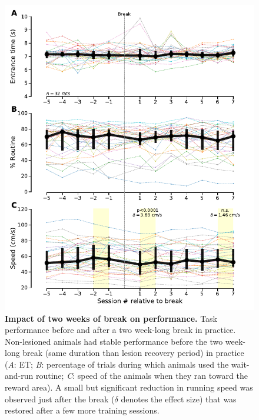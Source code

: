 \begin{figure}[h!]
	\begin{center}
		\includegraphics[scale=1]{ch-appendicies/figures/BreakEffect.pdf}
		\caption[Impact of a Two-week Break]
		{\textbf{Impact of two weeks of break on performance.}
		Task performance before and after a two week-long break in practice.
		Non-lesioned animals had stable performance before the two week-long break (same duration than lesion recovery period) in practice (\textit{A}: ET; \textit{B}: percentage of trials during which animals used the wait-and-run routine; \textit{C}: speed of the animals when they ran toward the reward area).
		A small but significant reduction in running speed was observed just after the break ($\delta$ denotes the effect size) that was restored after a few more training sessions.
		}
		\label{fig:appendix:break}
	\end{center}
\end{figure}